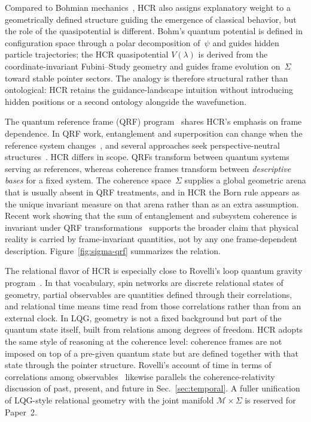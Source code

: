 \documentclass[aps,prd,twocolumn,superscriptaddress,nofootinbib,floatfix]{revtex4-2}
\newcommand{\Sig}{\Sigma}
\newcommand{\HCR}{HCR}
\newcommand{\CR}{\HCR}  %
\begin{document}
Compared to Bohmian mechanics~\cite{Bohm1952}, \CR{} also assigns explanatory weight to a geometrically defined structure guiding the emergence of classical behavior, but the role of the quasipotential is different. Bohm's quantum potential is defined in configuration space through a polar decomposition of~$\psi$ and guides hidden particle trajectories; the HCR quasipotential $V(\lambda)$ is derived from the coordinate-invariant Fubini--Study geometry and guides frame evolution on~$\Sig$ toward stable pointer sectors. The analogy is therefore structural rather than ontological: \CR{} retains the guidance-landscape intuition without introducing hidden positions or a second ontology alongside the wavefunction.

The quantum reference frame (QRF) program~\cite{bartlettReferenceFramesSuperselection2007,giacominiQuantumMechanicsCovariance2019,delahametteQuantumReferenceFrames2020} shares \CR{}'s emphasis on frame dependence. In QRF work, entanglement and superposition can change when the reference system changes~\cite{giacominiQuantumMechanicsCovariance2019}, and several approaches seek perspective-neutral structures~\cite{vanrietveldeChangePerspectiveSwitching2020,loveridgeSymmetryReferenceFrames2018}. \CR{} differs in scope. QRFs transform between quantum systems serving as references, whereas coherence frames transform between \emph{descriptive bases} for a fixed system. The coherence space~$\Sig$ supplies a global geometric arena that is usually absent in QRF treatments, and in \CR{} the Born rule appears as the unique invariant measure on that arena rather than as an extra assumption. Recent work showing that the sum of entanglement and subsystem coherence is invariant under QRF transformations~\cite{cepollaroSumEntanglementSubsystem2025} supports the broader claim that physical reality is carried by frame-invariant quantities, not by any one frame-dependent description. Figure~\ref{fig:sigma-qrf} summarizes the relation.

The relational flavor of \CR{} is especially close to Rovelli's loop quantum gravity program~\cite{rovelliQuantumGravity2004}. In that vocabulary, spin networks are discrete relational states of geometry, partial observables are quantities defined through their correlations, and relational time means time read from those correlations rather than from an external clock. In LQG, geometry is not a fixed background but part of the quantum state itself, built from relations among degrees of freedom. \CR{} adopts the same style of reasoning at the coherence level: coherence frames are not imposed on top of a pre-given quantum state but are defined together with that state through the pointer structure. Rovelli's account of time in terms of correlations among observables~\cite{rovelliPartialObservables2002} likewise parallels the coherence-relativity discussion of past, present, and future in Sec.~\ref{sec:temporal}. A fuller unification of LQG-style relational geometry with the joint manifold $\mathcal{M}\times\Sig$ is reserved for Paper~2.
\end{document}
